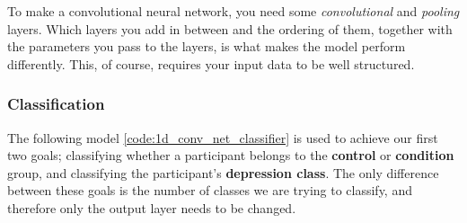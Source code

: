 To make a convolutional neural network, you need some \textit{convolutional} and \textit{pooling} layers.
Which layers you add in between and the ordering of them, together with the parameters you pass to the layers, 
is what makes the model perform differently. This, of course, requires your input data to be well structured.

\subsubsection{Classification}
The following model \ref{code:1d_conv_net_classifier} is used to achieve our first two goals; classifying whether a 
participant belongs to the \textbf{control} or \textbf{condition} group, and classifying the participant's \textbf{depression class}.
The only difference between these goals is the number of classes we are trying to classify, and therefore only the output layer needs to be changed.

